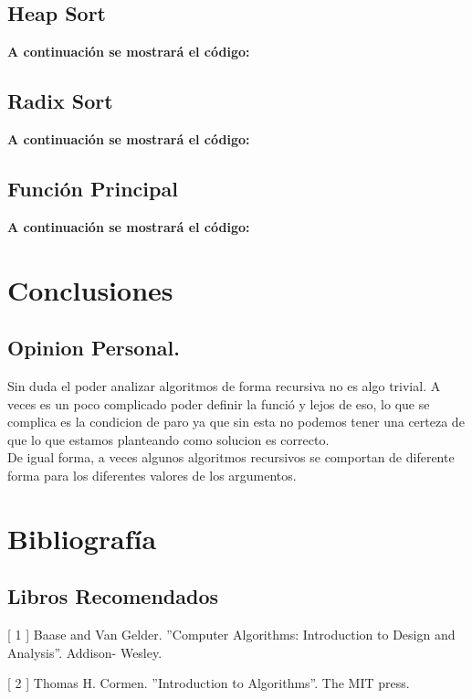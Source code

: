 \documentclass[a4paper]{article} %
\begin{document}
		\subsection*{Heap Sort}
			\textbf{ A continuación se mostrará el código:}
			
			\afterpage{\newpage}
			\newpage
		\subsection*{Radix Sort}	
			\textbf{ A continuación se mostrará el código:}
				
			\afterpage{\newpage}
			\newpage		
		\subsection*{Función Principal}	
			\textbf{ A continuación se mostrará el código:}
							
			\afterpage{\newpage}
			\newpage		
	\section*{Conclusiones}
		\subsection*{Opinion Personal.}
		\vspace{0.5cm}
		Sin duda el poder analizar algoritmos de forma recursiva no es algo trivial. A veces es un poco complicado poder definir la funció y lejos de eso, lo que se complica es la condicion de paro ya que sin esta no podemos tener una certeza de que lo que estamos planteando como solucion es correcto.\\
		De igual forma, a veces algunos algoritmos recursivos se comportan de diferente forma para los diferentes valores de los argumentos.
		
	
	\afterpage{\newpage}
	\newpage		
	\section*{Bibliografía}
		\subsection*{Libros Recomendados}
		[ 1 ] Baase and Van Gelder.  ”Computer Algorithms:  Introduction to Design and Analysis”.  Addison-                						  Wesley.
		 
		[ 2 ] Thomas H. Cormen.  ”Introduction to Algorithms”.  The MIT press.
		
\end{document}
